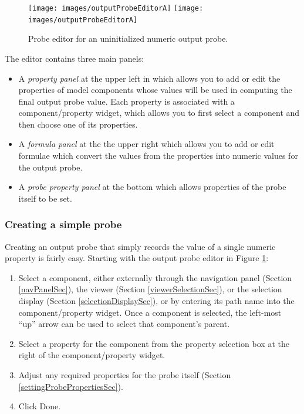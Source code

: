 \documentclass{article}
\begin{document}
\begin{figure}
\begin{center}
\iflatexml
\texttt{[image: images/outputProbeEditorA]}
\else
\texttt{[image: images/outputProbeEditorA]}
\fi
\end{center}
\caption{Probe editor for an uninitialized numeric output probe.}%
\label{OutputProbeEditorAFig}
\end{figure}

The editor contains three main panels:

\begin{itemize}

\item A {\it property panel} at the upper left in which allows you
to add or edit the properties of model components whose values will be used in
computing the final output probe value. Each property is
associated with a component/property widget, which allows you to first
select a component and then choose one of its properties.

\item A {\it formula panel} at the the upper right which allows
you to add or edit formulae which convert the values from
the properties into numeric values for the output probe.

\item A {\it probe property panel} at the bottom which allows properties of
the probe itself to be set.

\end{itemize}

\subsubsection{Creating a simple probe}
\label{simpleOutputProbeSec}

Creating an output probe that simply records the value of a single
numeric property is fairly easy. Starting with the output
probe editor in Figure \ref{OutputProbeEditorAFig}:

\begin{enumerate}

\item Select a component, either externally through the navigation panel
(Section \ref{navPanelSec}), the viewer 
(Section \ref{viewerSelectionSec}), or the selection
display (Section \ref{selectionDisplaySec}), or by entering its path name into the
component/property widget. Once a component is selected,
the left-most ``up'' arrow can be used to select that
component's parent.

\item Select a property for the component from the property
selection box at the right of the component/property widget.

\item Adjust any required properties for the probe itself 
(Section \ref{settingProbePropertiesSec}).

\item Click {\sf Done}.

\end{enumerate}
\end{document}
